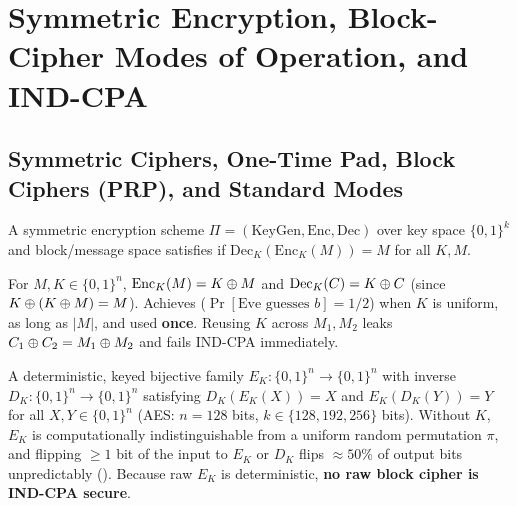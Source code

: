 \section{Symmetric Encryption, Block-Cipher Modes of Operation, and IND-CPA}

\subsection{Symmetric Ciphers, One-Time Pad, Block Ciphers (PRP), and Standard Modes}
A symmetric encryption scheme $\Pi = (\mathrm{KeyGen}, \mathrm{Enc}, \mathrm{Dec})$ over key space $\{0,1\}^k$ and block/message space satisfies  if $\mathrm{Dec}_K(\mathrm{Enc}_K(M)) = M$ for all $K, M$.
\begin{compactitem}
  \item {} For $M, K \in \{0,1\}^n$, $\mathrm{Enc}_K(M) = K \oplus M$ and $\mathrm{Dec}_K(C) = K \oplus C$ (since $K \oplus (K \oplus M) = M$). Achieves  ($\Pr[\text{Eve guesses } b] = 1/2$) when $K$ is uniform, as long as $|M|$, and used \textbf{once}. Reusing $K$ across $M_1, M_2$ leaks $C_1 \oplus C_2 = M_1 \oplus M_2$ and fails IND-CPA immediately.
  \item {} A deterministic, keyed bijective family $E_K : \{0,1\}^n \to \{0,1\}^n$ with inverse $D_K : \{0,1\}^n \to \{0,1\}^n$ satisfying $D_K(E_K(X)) = X$ and $E_K(D_K(Y)) = Y$ for all $X, Y \in \{0,1\}^n$ (AES: $n = 128$ bits, $k \in \{128, 192, 256\}$ bits). Without $K$, $E_K$ is computationally indistinguishable from a uniform random permutation $\pi$, and flipping $\ge 1$ bit of the input to $E_K$ or $D_K$ flips $\approx 50\%$ of output bits unpredictably (). Because raw $E_K$ is deterministic, \textbf{no raw block cipher is IND-CPA secure}.
\end{compactitem}

